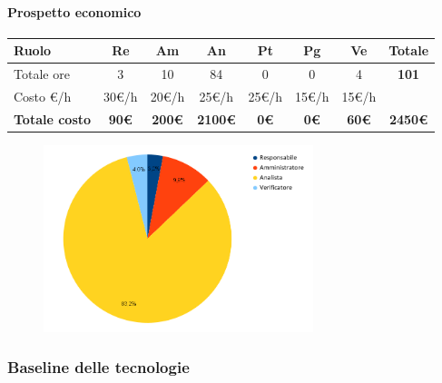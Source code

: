 \paragraph{Prospetto economico}
\begin{center}
	\renewcommand{\arraystretch}{1.8} %
	\begin{tabular}{ |m{10em}|c|c|c|c|c|c|c| }
	\hline
	\textbf{Ruolo} & \textbf{Re} & \textbf{Am} &  \textbf{An} &  \textbf{Pt} &  \textbf{Pg} &  \textbf{Ve} &  \textbf{Totale}\\
    \hline
    Totale ore & 3 & 10 & 84 & 0 & 0 & 4 & \textbf{101}\\
    \hline
    Costo \euro/h & 30\euro/h & 20\euro/h & 25\euro/h & 25\euro/h & 15\euro/h & 15\euro/h & \\
    \hline
    \textbf{Totale costo} & \textbf{90\euro} & \textbf{200\euro} &  \textbf{2100\euro} &  \textbf{0\euro} &  \textbf{0\euro} &  \textbf{60\euro} &  \textbf{2450\euro}\\
    \hline
	\end{tabular}

    \begin{figure}[H]
        \centering\includegraphics[width=0.7\textwidth, height=0.7\textheight, keepaspectratio]{images/preventivo/RTB-requisiti-costo.png}
    \end{figure}
    
\end{center}

\subsubsection{Baseline delle tecnologie}